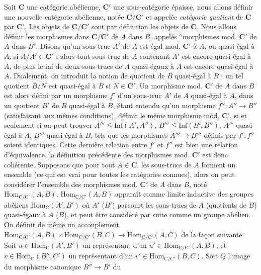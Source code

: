 Soit $\mathbf{C}$ une catégorie abélienne, $\mathbf{C}'$ une sous-catégorie épaisse, nous allons
définir une nouvelle catégorie abélienne, notée $\mathbf{C}/\mathbf{C}'$ et appelée
\textit{catégorie quotient} de $\mathbf{C}$ par $\mathbf{C}'$. Les objets de $\mathbf{C}/\mathbf{C}'$ sont par
définition les objets de $\mathbf{C}$. Nous allons définir les morphismes dans $\mathbf{C}/\mathbf{C}'$
de $A$ dans $B$, appelés ``morphismes mod. $\mathbf{C}'$ de $A$ dans $B$''.
Disons qu'un sous-truc $A'$ de $A$ est égal mod. $\mathbf{C}'$ à $A$, ou quasi-égal à
$A$, si $A/A'\in \mathbf{C}'$ ; alors tout sous-truc de $A$ contenant $A'$ est encore
quasi-égal à $A$, de plus le inf de deux sous-trucs de $A$ quasi-égaux à $A$
est encore quasi-égal à $A$. Dualement, on introduit la notion de quotient de
$B$ quasi-égal à $B$ : un tel quotient $B/N$ est quasi-égal à $B$ si
$N\in \mathbf{C}'$.
Un morphisme mod. $\mathbf{C}'$ de $A$ dans $B$ est alors défini par un morphisme $f'$
d'un sous-truc $A'$ de $A$ quasi-égal à $A$, dans un quotient $B'$ de $B$
quasi-égal à $B$, étant entendu qu'un morphisme
$f'':A''\to B''$ (satisfaisant aux mêmes conditions), définit le
même morphisme mod. $\mathbf{C}'$, si et seulement si on peut trouver
$A'''\leqq\mathrm{Inf}(A',A'')$, $B'''\leqq\mathrm{Inf}(B',B'')$, $A'''$ quasi
égal à $A$, $B'''$ quasi égal à $B$, tels que les morphismes
$A'''\to B'''$ définis par $f',f''$ soient identiques. Cette
dernière relation entre $f'$ et $f''$ est bien une relation d'équivalence, la
définition précédente des morphismes mod. $\mathbf{C}'$ est donc cohérente.
Supposons que pour tout $A\in \mathbf{C}$, les sous-trucs de $A$ forment un ensemble
(ce qui est vrai pour toutes les catégories connues), alors on peut
considérer l'ensemble des morphismes mod. $\mathbf{C}'$ de $A$ dans $B$, noté
$\mathrm{Hom}_{\mathrm{C}/\mathrm{C}'}(A,B)$. $\mathrm{Hom}_{\mathrm{C}/\mathrm{C}'}(A,B)$ apparaît comme limite
inductive des groupes abéliens $\mathrm{Hom}_{\mathrm{C}}(A',B')$ où $A'$ ($B'$)
parcourt les sous-trucs de $A$ (quotients de $B$) quasi-égaux à $A$ ($B$), et
peut être considéré par suite comme un groupe abélien.
On définit de même un accouplement
$\mathrm{Hom}_{\mathrm{C}/\mathrm{C}'}(A,B)\times\mathrm{Hom}_{\mathrm{C}/\mathrm{C}'}(B,C)  \to\mathrm{Hom}_{\mathrm{C}/\mathrm{C}'}(A,C)$ de la façon suivante. Soit $u\in\mathrm{Hom}_{\mathrm{C}}(A',B')$ un
représentant d'un $u'\in\mathrm{Hom}_{\mathrm{C}/\mathrm{C}'}(A,B)$, et
$v\in\mathrm{Hom}_{\mathrm{C}}(B'',C')$ un représentant d'un
$v'\in\mathrm{Hom}_{\mathrm{C}/\mathrm{C}'}(B,C)$. Soit $Q$ l'image du morphisme canonique
$B''\to B'$ du

